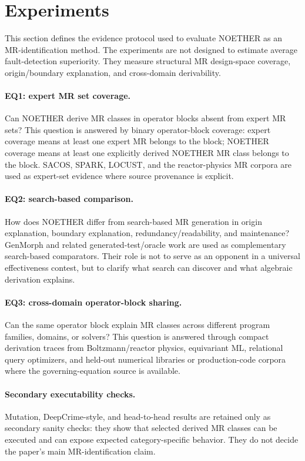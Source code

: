 \documentclass[manuscript]{acmart}
\begin{document}
\section{Experiments}
\label{sec:experiments}

This section defines the evidence protocol used to evaluate NOETHER as an MR-identification method. The experiments are not designed to estimate average fault-detection superiority. They measure structural MR design-space coverage, origin/boundary explanation, and cross-domain derivability.

\paragraph{EQ1: expert MR set coverage.}
Can NOETHER derive MR classes in operator blocks absent from expert MR sets? This question is answered by binary operator-block coverage: expert coverage means at least one expert MR belongs to the block; NOETHER coverage means at least one explicitly derived NOETHER MR class belongs to the block. SACOS, SPARK, LOCUST, and the reactor-physics MR corpora are used as expert-set evidence where source provenance is explicit.

\paragraph{EQ2: search-based comparison.}
How does NOETHER differ from search-based MR generation in origin explanation, boundary explanation, redundancy/readability, and maintenance? GenMorph and related generated-test/oracle work are used as complementary search-based comparators. Their role is not to serve as an opponent in a universal effectiveness contest, but to clarify what search can discover and what algebraic derivation explains.

\paragraph{EQ3: cross-domain operator-block sharing.}
Can the same operator block explain MR classes across different program families, domains, or solvers? This question is answered through compact derivation traces from Boltzmann/reactor physics, equivariant ML, relational query optimizers, and held-out numerical libraries or production-code corpora where the governing-equation source is available.

\paragraph{Secondary executability checks.}
Mutation, DeepCrime-style, and head-to-head results are retained only as secondary sanity checks: they show that selected derived MR classes can be executed and can expose expected category-specific behavior. They do not decide the paper's main MR-identification claim.
\end{document}
